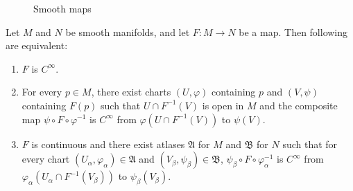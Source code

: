 \begin{figure}[h]
    \centering
    
    \caption{Smooth maps}
\end{figure}

\begin{comment}
We show now that smoothness implies continuity, and that the smoothness of a map is independent of the choice of charts.

\begin{lemma}\label{lem:smooth map is continuous}
    Let $M, N$ be smooth manifolds, and let $F : M \to N$ be a smooth map.
    \begin{enumerate}
        \item If $(U, \varphi)$ is arbitrary chart containing $p \in M$ and $(V, \psi)$ is arbitrary chart containing $F(p) \in N$, then $\psi\circ F \circ \varphi^{-1}$ is $C^\infty$ on $M$.
    \end{enumerate}
\end{lemma}

\begin{proof}
    (i) Let $p \in M$ be arbitrary. Suppose that $F$ is smooth at $p$. By definition, there are charts $(U, \varphi)$ containing $p \in M$ and $(V, \psi)$ containing $F(p) \in N$ such that $F(U) \subset V$ and the composite $\psi \circ F \circ \varphi^{-1}$ is $C^\infty$ at $\varphi(p)$ from $\varphi(U)$ to $\psi(V)$, hence $F$ is continuous on $\varphi(U)$. Since $\varphi : U \to \varphi(U)$ and $\psi : V \to \psi(V)$ are homeomorphisms, then the composite of continuous maps $F = \psi^{-1} \circ (\psi \circ F \circ \varphi^{-1}) \circ \varphi$ from $U$ to $V$ is also continuous. Since $p$ is arbitrary, $F$ is continuous.
\end{proof}
\end{comment}

\begin{proposition}\label{lem:characterisation of smooth maps}
    Let $M$ and $N$ be smooth manifolds, and let $F : M \to N$ be a map. Then following are equivalent:
    \begin{enumerate}
        \item $F$ is $C^\infty$.
        \item For every $p \in M$, there exist charts $(U, \varphi)$ containing $p$ and $(V, \psi)$ containing $F(p)$ such that $U \cap F^{-1}(V)$ is open in $M$ and the composite map $\psi \circ F \circ \varphi^{-1}$ is $C^\infty$ from $\varphi(U \cap F^{-1}(V))$ to $\psi(V)$.
        \item $F$ is continuous and there exist atlases $\mathfrak{A}$ for $M$ and $\mathfrak{B}$ for $N$ such that for every chart $(U_\alpha, \varphi_\alpha) \in \mathfrak{A}$ and $(V_\beta, \psi_\beta) \in \mathfrak{B}$, $\psi_\beta \circ F \circ \varphi_\alpha^{-1}$ is $C^\infty$ from $\varphi_\alpha(U_\alpha \cap F^{-1}(V_\beta))$ to $\psi_\beta(V_\beta)$.
    \end{enumerate}
\end{proposition}

